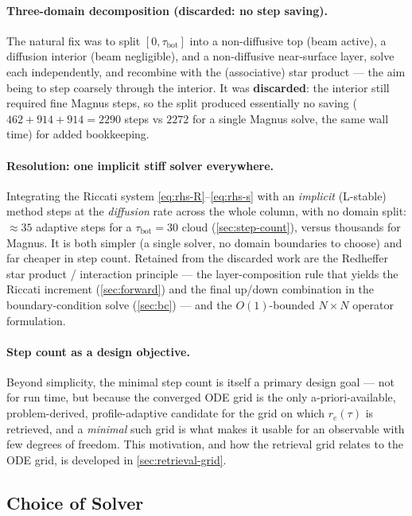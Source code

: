 \documentclass[11pt,a4paper]{article}
\newcommand{\tbot}{\tau_{\mathrm{bot}}}
\theoremstyle{definition}
\begin{document}
\paragraph{Three-domain decomposition (discarded: no step saving).}
The natural fix was to split $[0,\tbot]$ into a non-diffusive top (beam
active), a diffusion interior (beam negligible), and a non-diffusive
near-surface layer, solve each independently, and recombine with the
(associative) star product --- the aim being to step coarsely through the
interior.  It was \textbf{discarded}: the interior still required fine
Magnus steps, so the split produced essentially no saving
($462+914+914 = 2290$ steps vs $2272$ for a single Magnus solve, the
same wall time) for added bookkeeping.

\paragraph{Resolution: one implicit stiff solver everywhere.}
Integrating the Riccati system \eqref{eq:rhs-R}--\eqref{eq:rhs-s} with an
\emph{implicit} (L-stable) method steps at the \emph{diffusion} rate
across the whole column, with no domain split: $\approx 35$ adaptive
steps for a $\tbot=30$ cloud (\cref{sec:step-count}), versus thousands
for Magnus.  It is both simpler (a single solver, no domain boundaries to
choose) and far cheaper in step count.  Retained from the discarded work
are the Redheffer star product / interaction principle --- the
layer-composition rule that yields the Riccati increment
(\cref{sec:forward}) and the final up/down combination in the
boundary-condition solve (\cref{sec:bc}) --- and the $O(1)$-bounded
$N\!\times\!N$ operator formulation.

\paragraph{Step count as a design objective.}
Beyond simplicity, the minimal step count is itself a primary design
goal --- not for run time, but because the converged ODE grid is the only
a-priori-available, problem-derived, profile-adaptive candidate for the
grid on which $r_e(\tau)$ is retrieved, and a \emph{minimal} such grid is
what makes it usable for an observable with few degrees of freedom.  This
motivation, and how the retrieval grid relates to the ODE grid, is
developed in \cref{sec:retrieval-grid}.

\subsection{Choice of Solver}
\end{document}
